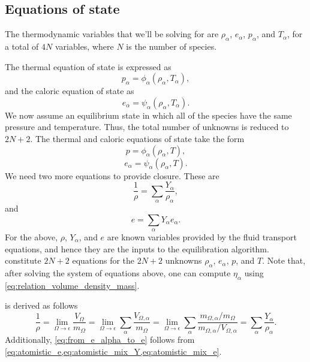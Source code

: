 \documentclass[oneside,a4paper,11pt]{report}
\begin{document}
\subsection{Equations of state}
The thermodynamic variables that we'll be solving for are $\rho_\alpha$, $e_\alpha$, $p_\alpha$, and $T_\alpha$, for a total of $4N$ variables, where $N$ is the number of species.

The thermal equation of state is expressed as
\begin{equation}
    \label{eq:multi_species_thermal_eos}
    p_\alpha = \phi_\alpha (\rho_\alpha, T_\alpha),
\end{equation}
and the caloric equation of state as
\begin{equation}
    \label{eq:multi_species_caloric_eos}
    e_\alpha = \psi_\alpha (\rho_\alpha, T_\alpha).
\end{equation}
We now assume an equilibrium state in which all of the species have the same pressure and temperature. Thus, the total number of unknowns is reduced to $2N+2$. The thermal and caloric equations of state take the form
\begin{equation}
\label{eq:eos_thermal_multicomponent}
    p = \phi_\alpha (\rho_\alpha, T),
\end{equation}
\begin{equation}
\label{eq:eos_caloric_multicomponent}
    e_\alpha = \psi_\alpha (\rho_\alpha, T).
\end{equation}
We need two more equations to provide closure. These are
\begin{equation}
\label{eq:from_rho_alpha_to_rho_Y}
   \frac{1}{\rho} = \sum_\alpha \frac{Y_\alpha}{\rho_\alpha},
\end{equation}
and
\begin{equation}
\label{eq:from_e_alpha_to_e}
    e = \sum_\alpha Y_\alpha e_\alpha.
\end{equation}
For the above, $\rho$, $Y_\alpha$, and $e$ are known variables provided by the fluid transport equations, and hence they are the inputs to the equilibration algorithm.  constitute $2N+2$ equations for the $2N+2$ unknowns $\rho_\alpha$, $e_\alpha$, $p$, and $T$. Note that, after solving the system of equations above, one can compute $\eta_\alpha$ using \cref{eq:relation_volume_density_mass}.

 is derived as follows
\begin{equation*}
    \frac{1}{\rho} = \lim_{\Omega \to \epsilon} \frac{V_\Omega}{m_\Omega} = \lim_{\Omega \to \epsilon} \sum_\alpha \frac{V_{\Omega,\alpha}}{m_\Omega} = \lim_{\Omega \to \epsilon} \sum_\alpha \frac{m_{\Omega,\alpha} / m_\Omega}{m_{\Omega,\alpha} / V_{\Omega,\alpha}} = \sum_\alpha \frac{Y_\alpha}{\rho_\alpha}.
\end{equation*}
Additionally, \cref{eq:from_e_alpha_to_e} follows from \cref{eq:atomistic_e,eq:atomistic_mix_Y,eq:atomistic_mix_e}. 
\end{document}
